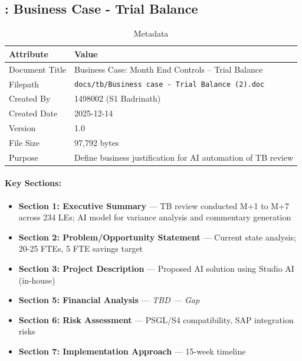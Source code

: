 \subsection{: Business Case - Trial Balance}
\label{sec:tb-bc-001}

\begin{table}[h]
\centering
\caption{ Metadata}
\begin{tabularx}{\textwidth}{@{}L{4cm}L{10cm}@{}}
\toprule
\textbf{Attribute} & \textbf{Value} \\
\midrule
Document Title & Business Case: Month End Controls -- Trial Balance \\
Filepath & \texttt{docs/tb/Business case - Trial Balance (2).doc} \\
Created By & 1498002 (S1 Badrinath) \\
Created Date & 2025-12-14 \\
Version & 1.0 \\
File Size & 97,792 bytes \\
Purpose & Define business justification for AI automation of TB review \\
\bottomrule
\end{tabularx}
\end{table}

\paragraph{Key Sections:}
\begin{itemize}[noitemsep]
  \item \textbf{Section 1: Executive Summary} --- TB review conducted M+1 to M+7 across 234 LEs; AI model for variance analysis and commentary generation
  \item \textbf{Section 2: Problem/Opportunity Statement} --- Current state analysis; 20-25 FTEs, 5 FTE savings target
  \item \textbf{Section 3: Project Description} --- Proposed AI solution using Studio AI (in-house)
  \item \textbf{Section 5: Financial Analysis} --- \textit{TBD --- Gap }
  \item \textbf{Section 6: Risk Assessment} --- PSGL/S4 compatibility, SAP integration risks
  \item \textbf{Section 7: Implementation Approach} --- 15-week timeline
\end{itemize}

